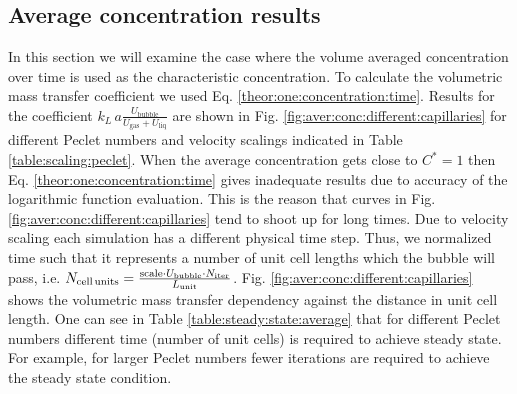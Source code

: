 \documentclass[review,12pt]{elsarticle}
\newcommand{\beqal}{\begin{equation}\begin{aligned}}
\newcommand{\feqal}{\end{aligned}\end{equation}}
\newcommand{\vol}{k_L\,a}
\newcommand{\lunit}{L_{\mathrm{unit}}}
\newcommand{\ububble}{U_{\mathrm{bubble}}}
\newcommand{\uliq}{U_{\mathrm{liq}}}
\newcommand{\ugas}{U_{\mathrm{gas}}}
\newcommand{\cstar}{C^{*}}
\begin{document}
\subsection{Average concentration results}
\label{main:results:periodic}
In this section we will examine the case where the volume averaged concentration over
 time is used as the characteristic concentration. To calculate the volumetric mass transfer coefficient we used Eq. \ref{theor:one:concentration:time}.
Results for the coefficient $\vol \frac{\ububble}{\ugas+\uliq}$ are shown in Fig.
\ref{fig:aver:conc:different:capillaries} for different Peclet numbers and velocity scalings
indicated in Table \ref{table:scaling:peclet}. When the average concentration gets
close to $\cstar=1$ then Eq. \ref{theor:one:concentration:time} gives inadequate results due to
 accuracy of the logarithmic function evaluation. This is the reason that curves in Fig. \ref{fig:aver:conc:different:capillaries}
 tend to shoot up for long times.
Due to velocity scaling
each simulation has a different physical time step. Thus, we normalized time such that it represents a number of unit cell lengths which the bubble will pass, i.e. 
$N_{\text{cell\,units}}=\frac{\text{scale}\cdot \ububble\cdot N_{\mathrm{iter}}}{\lunit}$.  Fig.
\ref{fig:aver:conc:different:capillaries} shows the volumetric mass transfer
dependency against the distance in unit cell length. One can see in Table
\ref{table:steady:state:average} that for different Peclet numbers different time (number of unit
cells) is required to achieve  steady state. For example, for
larger Peclet numbers fewer iterations are required to achieve the steady state condition. 
\end{document}
